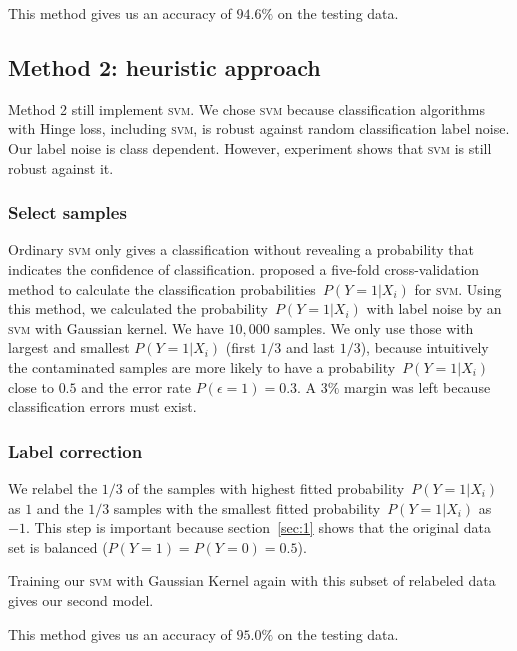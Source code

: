 \documentclass{article} %
\begin{document}
This method gives us an accuracy of $94.6\%$ on the testing data.

\subsection{Method 2: heuristic approach}
Method 2 still implement \textsc{svm}. We chose \textsc{svm} because classification algorithms with Hinge loss, including \textsc{svm}, is robust against random classification label noise. Our label noise is class dependent. However, experiment shows that \textsc{svm} is still robust against it.

\subsubsection{Select samples}
Ordinary \textsc{svm} only gives a classification without revealing a probability that indicates the confidence of classification. \citet{Wu03probabilityestimates} proposed a five-fold cross-validation method to calculate the classification probabilities~$P(Y=1|X_i)$ for \textsc{svm}. 
Using this method, we calculated the probability~$P(Y=1|X_i)$ with label noise by an \textsc{svm} with Gaussian kernel. We have $10,000$ samples. We only use those with largest and smallest $P(Y=1|X_i)$ (first $1/3$ and last $1/3$), because intuitively the contaminated samples are more likely to have a probability~$P(Y=1|X_i)$ close to $0.5$ and the error rate $P(\epsilon=1)=0.3$. A $3\%$ margin was left because classification errors must exist.
\subsubsection{Label correction}
We relabel the $1/3$ of the samples with highest fitted probability~$P(Y=1|X_i)$ as $1$ and the $1/3$ samples with the smallest fitted probability~$P(Y=1|X_i)$ as $-1$. This step is important because section~\ref{sec:1} shows that the original data set is balanced ($P(Y=1)=P(Y=0)=0.5$). 

Training our \textsc{svm} with Gaussian Kernel again with this subset of relabeled data gives our second model.

This method gives us an accuracy of $95.0\%$ on the testing data.
\end{document}
